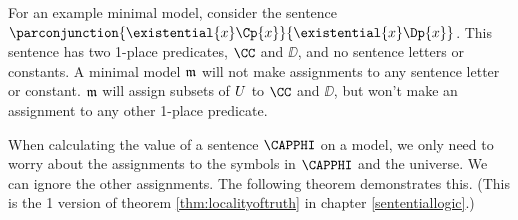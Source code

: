 For an example minimal model, consider the sentence $\parconjunction{\existential{\variable{x}}\Cp{\variable{x}}}{\existential{\variable{x}}\Dp{\variable{x}}}$.  This sentence has two 1-place predicates, $\CC$ and $\DD$, and no sentence letters or constants.  A minimal model $\mathfrak{m}$ will not make assignments to any sentence letter or constant.  $\mathfrak{m}$ will assign subsets of $U$ to $\CC$ and $\DD$, but won't make an assignment to any other 1-place predicate.

When calculating the value of a sentence $\CAPPHI$ on a model, we only need to worry about the assignments to the symbols in $\CAPPHI$ and the universe.  We can ignore the other assignments.  The following theorem demonstrates this.  (This is the \GQL{}1 version of theorem \ref{thm:localityoftruth} in chapter \ref{sententiallogic}.)

